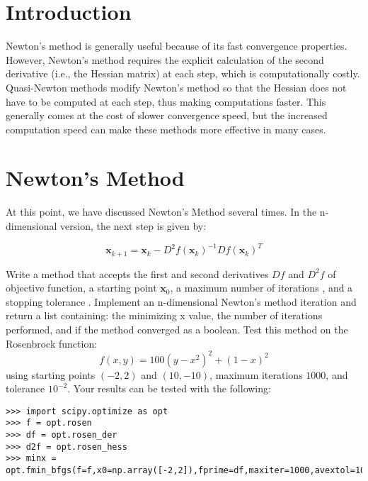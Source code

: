 

\section*{Introduction}
Newton's method is generally useful because of its fast convergence properties. 
However, Newton's method requires the explicit calculation of the second derivative (i.e., the Hessian matrix) at each step, which is computationally costly. 
Quasi-Newton methods modify Newton's method so that the Hessian does not have to be computed at each step, thus making computations faster.
This generally comes at the cost of slower convergence speed, but the increased computation speed can make these methods more effective in many cases.

\section*{Newton's Method}
At this point, we have discussed Newton's Method several times. In the n-dimensional version,
the next step is given by:

\begin{equation} \label{Eq:BasicNewton}
\mathbf{x}_{k+1} = \mathbf{x}_k - D^2f(\mathbf{x}_k)^{-1}Df(\mathbf{x}_k)^T
\end{equation}

\begin{problem}
Write a method that accepts the first and second derivatives $Df$ and $D^2f$ of objective function,  a starting point $\textbf{x}_0$, a maximum number of iterations , and a stopping tolerance .
Implement an n-dimensional Newton's method iteration and return a list containing: the minimizing x value, the number of iterations performed, and if the method converged as a boolean.
Test this method on the Rosenbrock function:
\[
f(x,y) = 100(y-x^2)^2 + (1-x)^2
\]
using starting points $(-2,2)$ and $(10,-10)$, maximum iterations $1000$, and tolerance $10^{-2}$.
Your results can be tested with the following:
\begin{lstlisting}
>>> import scipy.optimize as opt
>>> f = opt.rosen
>>> df = opt.rosen_der
>>> d2f = opt.rosen_hess
>>> minx = opt.fmin_bfgs(f=f,x0=np.array([-2,2]),fprime=df,maxiter=1000,avextol=10**-2)
\end{lstlisting}
\end{problem}

